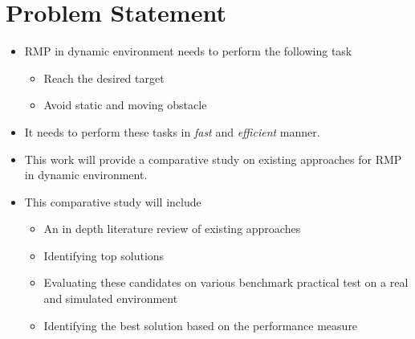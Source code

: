 \documentclass[rnd]{mas_proposal}
\begin{document}
\section{Problem Statement}
\begin{itemize}
    \item RMP in dynamic environment needs to perform the following task
        \begin{itemize}
            \item Reach the desired target
            \item Avoid static and moving obstacle
        \end{itemize}
    \item It needs to perform these tasks in \textit{fast} and \textit{efficient} manner.
    \item This work will provide a comparative study on existing approaches for RMP in dynamic environment.
    \item This comparative study will include 
        \begin{itemize}
            \item An in depth literature review of existing approaches
            \item Identifying top solutions
            \item Evaluating these candidates on various benchmark practical test on a real and simulated environment
            \item Identifying the best solution based on the performance measure
        \end{itemize} 
\end{itemize}
\end{document}
